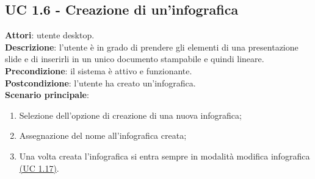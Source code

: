 \subsection{UC 1.6 - Creazione di un'infografica}{
	\label{uc1.6}
	\textbf{Attori}: utente desktop. \\
	\textbf{Descrizione}: l'utente è in grado di prendere gli elementi di una presentazione slide e di inserirli in un unico documento stampabile e quindi lineare. \\
	\textbf{Precondizione}: il sistema è attivo e funzionante.	\\
	\textbf{Postcondizione}: l'utente ha creato un'infografica.	\\
	\textbf{Scenario principale}:
	\begin{enumerate}
		\item Selezione dell'opzione di creazione di una nuova infografica;
		\item Assegnazione del nome all'infografica creata;
		\item Una volta creata l'infografica si entra sempre in modalità modifica infografica \hyperref[uc1.17]{(UC 1.17)}.
	\end{enumerate}
	}

